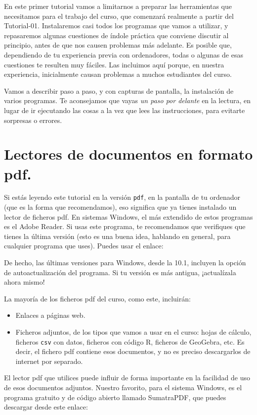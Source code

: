 \documentclass[10pt,a4paper]{article}\usepackage[]{graphicx}\usepackage[]{color}
\newcounter {cont01}
\begin{document}
En este primer tutorial vamos a limitarnos a preparar las herramientas que necesitamos para el
trabajo del curso, que comenzará realmente a partir del Tutorial-01. Instalaremos casi todos los
programas que vamos a utilizar, y repasaremos algunas cuestiones de índole práctica que conviene
discutir al principio, antes de que nos causen problemas más adelante. Es posible que, dependiendo
de tu experiencia previa con ordenadores, todas o algunas de esas cuestiones te resulten muy
fáciles. Las incluimos aquí porque, en nuestra experiencia, inicialmente causan problemas a muchos
estudiantes del curso.

Vamos a describir paso a paso, y con capturas de pantalla, la instalación de varios programas. Te
aconsejamos que vayas {\em un paso por delante} en la lectura, en lugar de ir ejecutando las cosas
a la vez que lees las instrucciones, para evitarte sorpresas o errores.

\section{Lectores de documentos en formato pdf.}
\label{tut00:sec:LectoresPdf}

Si estás leyendo este tutorial en la versión {\tt pdf}, en la pantalla de tu ordenador (que es la
forma que recomendamos), eso significa que ya tienes instalado un lector de ficheros pdf. En
sistemas Windows, el más extendido de estos programas es el Adobe Reader. Si usas este programa, te
recomendamos que verifiques que tienes la última versión (esto es una buena idea, hablando en
general, para cualquier programa que uses). Puedes usar el enlace:
\begin{center}
\end{center}
De hecho, las últimas versiones para Windows, desde la 10.1, incluyen la opción de
autoactualización del programa. Si tu versión es más antigua, ¡actualízala ahora mismo!

La mayoría de los ficheros pdf del curso, como este, incluirán:
\begin{itemize}
  \item Enlaces a páginas web.
  \item Ficheros adjuntos, de los tipos que vamos a usar en el curso: hojas de cálculo, ficheros
      {\tt csv}  con datos, ficheros con código R, ficheros de GeoGebra, etc.  Es decir, el
      fichero pdf contiene esos documentos, y no es preciso descargarlos de internet por
      separado.
\end{itemize}
El lector pdf que utilices puede influir de forma importante en la facilidad de uso de esos
documentos adjuntos. Nuestro favorito, para el sistema Windows, es el programa gratuito y de código
abierto llamado SumatraPDF, que puedes descargar desde este enlace:
\begin{center}
\end{center}
\end{document}
